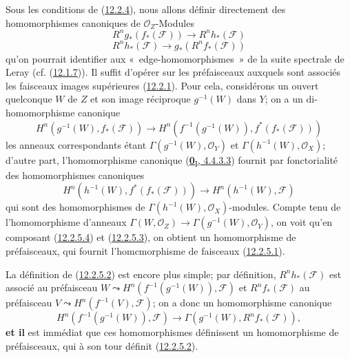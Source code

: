 \begin{env}[12.2.5]
\label{0.12.2.5-fr}
Sous les conditions de (\hyperref[0.12.2.4-fr]{12.2.4}), nous allons définir
directement des homomorphismes canoniques de $\mathcal O_Z$-Modules
\[
\label{0.12.2.5.1-fr}
\tag{12.2.5.1}
R^n g_*(f_*(\mathcal F))\longrightarrow R^n h_*(\mathcal F)
\]
\[
\label{0.12.2.5.2-fr}
\tag{12.2.5.2}
R^n h_*(\mathcal F)\longrightarrow g_*(R^n f_*(\mathcal F))
\]
qu'on pourrait identifier aux «~edge-homomorphismes~» de la suite spectrale
de Leray (cf. (\hyperref[0.12.1.7-fr]{12.1.7})). Il suffit d'opérer sur les
préfaisceaux auxquels sont associés les faisceaux images supérieures
(\hyperref[0.12.2.1-fr]{12.2.1}). Pour cela, considérons un ouvert quelconque
$W$ de $Z$ et son image réciproque $g^{-1}(W)$ dans $Y$; on a un
di-homomorphisme canonique
\[
\label{0.12.2.5.3-fr}
\tag{12.2.5.3}
H^n(g^{-1}(W),f_*(\mathcal F))\longrightarrow
H^n(f^{-1}(g^{-1}(W)),f^*(f_*(\mathcal F)))
\]
les anneaux correspondants étant $\Gamma(g^{-1}(W),\mathcal O_Y)$ et
$\Gamma(h^{-1}(W),\mathcal O_X)$; d'autre part, l'homomorphisme canonique
(\hyperref[0.4.4.3.3-fr]{\textbf{0}\textsubscript{I}, 4.4.3.3}) fournit par
fonctorialité des homomorphismes canoniques
\[
\label{0.12.2.5.4-fr}
\tag{12.2.5.4}
H^n(h^{-1}(W),f^*(f_*(\mathcal F)))\longrightarrow
H^n(h^{-1}(W),\mathcal F)
\]
qui sont des homomorphismes de $\Gamma(h^{-1}(W),\mathcal O_X)$-modules.
Compte tenu de l'homomorphisme d'anneaux
$\Gamma(W,\mathcal O_Z)\to\Gamma(g^{-1}(W),\mathcal O_Y)$, on voit qu'en
composant (\hyperref[0.12.2.5.4-fr]{12.2.5.4}) et
(\hyperref[0.12.2.5.3-fr]{12.2.5.3}), on obtient un homomorphisme de
préfaisceaux, qui fournit l'homcmorphisme de faisceaux
(\hyperref[0.12.2.5.1-fr]{12.2.5.1}).

La définition de (\hyperref[0.12.2.5.2-fr]{12.2.5.2}) est encore plus
simple; par définition, $R^n h_*(\mathcal F)$ est associé au préfaisceau
$W\leadsto H^n(f^{-1}(g^{-1}(W)),\mathcal F)$ et $R^n f_*(\mathcal F)$ au
préfaisceau $V\leadsto H^n(f^{-1}(V),\mathcal F)$; on a donc un homomorphisme
canonique
\[
H^n(f^{-1}(g^{-1}(W)),\mathcal F)\longrightarrow
\Gamma(g^{-1}(W),R^n f_*(\mathcal F)),
\]
\textbf{et il} est immédiat que ces homomorphismes définissent un homomorphisme de
préfaisceaux, qui à son tour définit
(\hyperref[0.12.2.5.2-fr]{12.2.5.2}).
\end{env}

